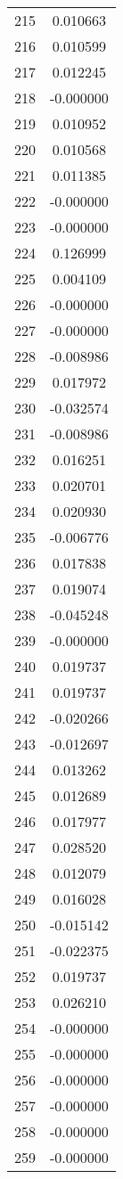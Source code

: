 \documentclass[12pt]{article}
\begin{document}
\begin{longtable}{@{}cc@{}}
215 & 0.010663 \\
216 & 0.010599 \\
217 & 0.012245 \\
218 & -0.000000 \\
219 & 0.010952 \\
220 & 0.010568 \\
221 & 0.011385 \\
222 & -0.000000 \\
223 & -0.000000 \\
224 & 0.126999 \\
225 & 0.004109 \\
226 & -0.000000 \\
227 & -0.000000 \\
228 & -0.008986 \\
229 & 0.017972 \\
230 & -0.032574 \\
231 & -0.008986 \\
232 & 0.016251 \\
233 & 0.020701 \\
234 & 0.020930 \\
235 & -0.006776 \\
236 & 0.017838 \\
237 & 0.019074 \\
238 & -0.045248 \\
239 & -0.000000 \\
240 & 0.019737 \\
241 & 0.019737 \\
242 & -0.020266 \\
243 & -0.012697 \\
244 & 0.013262 \\
245 & 0.012689 \\
246 & 0.017977 \\
247 & 0.028520 \\
248 & 0.012079 \\
249 & 0.016028 \\
250 & -0.015142 \\
251 & -0.022375 \\
252 & 0.019737 \\
253 & 0.026210 \\
254 & -0.000000 \\
255 & -0.000000 \\
256 & -0.000000 \\
257 & -0.000000 \\
258 & -0.000000 \\
259 & -0.000000 \\

\end{longtable}
\end{document}
